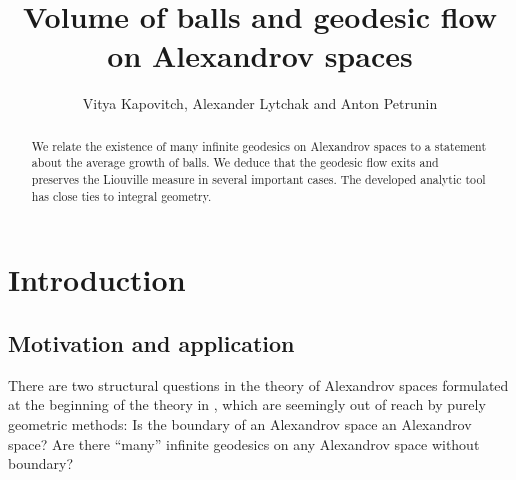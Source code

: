 \documentclass[12pt,leqno]{amsart}
\numberwithin{equation}{section}
\theoremstyle{definition}
\theoremstyle{remark}
\begin{document}
\pagebreak
%


\title{Volume of balls and geodesic flow  on Alexandrov spaces}

\author{Vitya Kapovitch, Alexander Lytchak and Anton Petrunin}







\begin{abstract}
 We relate the existence of many infinite geodesics on Alexandrov spaces to a statement about the average growth of balls. We deduce that the geodesic flow exits and preserves the Liouville measure in several important cases. The developed analytic tool has close ties  to integral geometry.
\end{abstract}


\maketitle
\renewcommand{\theequation}{\arabic{section}.\arabic{equation}}


\section{Introduction}
\subsection{Motivation and application}
There are two structural questions in the theory of Alexandrov spaces formulated at the beginning of the theory in
\cite{BGP}, \cite{P2}  which are seemingly out of reach by purely geometric methods:  Is the boundary of an Alexandrov space
an Alexandrov space?   Are there  ``many'' infinite geodesics on any Alexandrov space without boundary?
\end{document}
